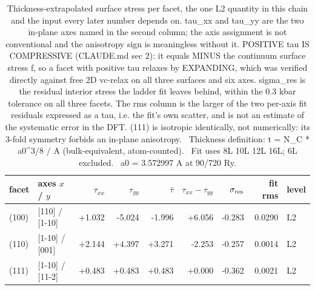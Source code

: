 \begin{table}[htbp]
  \centering
  \caption{Thickness-extrapolated surface stress per facet, the one L2 quantity in this chain and the input every later number depends on. tau\_xx and tau\_yy are the two in-plane axes named in the second column; the axis assignment is not conventional and the anisotropy sign is meaningless without it. POSITIVE tau IS COMPRESSIVE (CLAUDE.md sec 2): it equals MINUS the continuum surface stress f, so a facet with positive tau relaxes by EXPANDING, which was verified directly against free 2D vc-relax on all three surfaces and six axes. sigma\_res is the residual interior stress the ladder fit leaves behind, within the 0.3 kbar tolerance on all three facets. The rms column is the larger of the two per-axis fit residuals expressed as a tau, i.e. the fit's own scatter, and is not an estimate of the systematic error in the DFT. (111) is isotropic identically, not numerically: its 3-fold symmetry forbids an in-plane anisotropy. \textbullet\ Thickness definition: t = N\_C * a0\textasciicircum{}3/8 / A (bulk-equivalent, atom-counted). \textbullet\ Fit uses 8L 10L 12L 16L; 6L excluded. \textbullet\ a0 = 3.572997 A at 90/720 Ry.}
  \label{tab:t2-tau-infinity}
  \begin{tabular}{llrrrrrrl}
    \toprule
    facet & axes $x$ / $y$ & $\tau_{xx}$ & $\tau_{yy}$ & $\bar\tau$ & $\tau_{xx}-\tau_{yy}$ & $\sigma_{\rm res}$ & fit rms & level \\
    \midrule
    (100) & [110] / [1-10] & +1.032 & -5.024 & -1.996 & +6.056 & -0.283 & 0.0290 & L2 \\
    (110) & [1-10] / [001] & +2.144 & +4.397 & +3.271 & -2.253 & -0.257 & 0.0014 & L2 \\
    (111) & [1-10] / [11-2] & +0.483 & +0.483 & +0.483 & +0.000 & -0.362 & 0.0021 & L2 \\
    \bottomrule
  \end{tabular}
\end{table}
